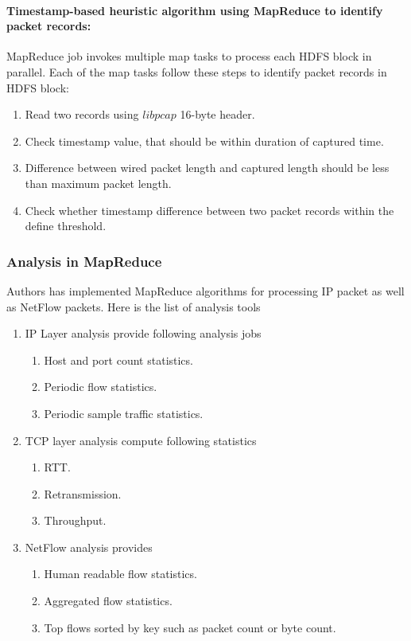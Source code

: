       \paragraph{Timestamp-based heuristic algorithm using MapReduce to identify packet records:}
	MapReduce job invokes multiple map tasks to process each HDFS block in parallel. Each of the map tasks follow these steps to
	identify packet records in HDFS block:
	\begin{enumerate}
	 \item Read two records using $libpcap$ 16-byte header.
	 \item Check timestamp value, that should be within duration of captured time.
	 \item Difference between wired packet length and captured length should be less than maximum packet length.
	 \item Check whether timestamp difference between two packet records within the define threshold. 
	\end{enumerate}
	
	\subsubsection{Analysis in MapReduce}
	Authors has implemented  MapReduce algorithms for processing IP packet as well as NetFlow packets.
	Here is the list of analysis tools
	\begin{enumerate}
	 \item IP Layer analysis provide following analysis jobs
	      \begin{enumerate}
	       \item Host and port count statistics.
	       \item Periodic flow statistics.
	       \item Periodic sample traffic statistics.
	      \end{enumerate}
	 \item TCP layer analysis compute following statistics
	       \begin{enumerate}
	        \item RTT.
	        \item Retransmission.
	        \item Throughput.
	       \end{enumerate}
	\item NetFlow analysis provides 
	      \begin{enumerate}
	       \item Human readable flow statistics.
	       \item Aggregated flow statistics.
	       \item Top flows sorted by key such as packet count or byte count. 
	      \end{enumerate}

	\end{enumerate}

